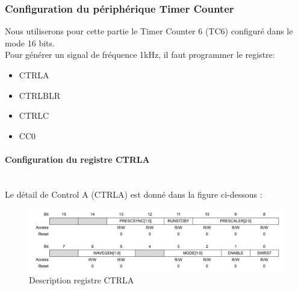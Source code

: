 \documentclass[a4paper]{article}
\begin{document}
	\subsubsection{Configuration du périphérique Timer Counter} 
	Nous utiliserons pour cette partie le Timer Counter 6 (TC6) configuré dans le mode 16 bits.\\
	Pour générer un signal de fréquence 1kHz, il faut programmer le registre:
	\begin{itemize}
		\item {CTRLA}
		\item {CTRLBLR}
		\item {CTRLC}
		\item {CC0}
	\end{itemize}
	\paragraph{Configuration du registre CTRLA} 
	~~\\
	Le détail de Control A (CTRLA) est donné dans la figure ci-dessous :
	\begin{figure}[H]
		\centering
		\includegraphics[width=0.9\linewidth]{ControlA.jpg}
		\caption{Description registre CTRLA}
	\end{figure}
	
\end{document}
